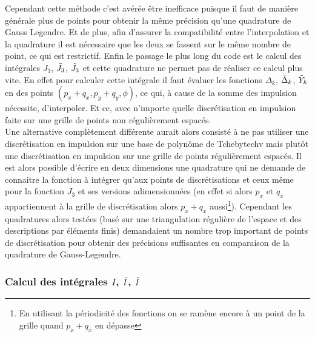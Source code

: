 \documentclass[10pt]{article}
\begin{document}
\begin{multicols}{2}
Cependant cette méthode c'est avérée être inefficace puisque il faut de manière générale plus de points pour obtenir la même précision qu'une quadrature de Gauss Legendre. Et de plus, afin d'assurer la compatibilité entre l'interpolation et la quadrature il est nécessaire que les deux se fassent sur le même nombre de point, ce qui est restrictif. Enfin le passage le plus long du code est le calcul des intégrales $J_3$, $\bar{J}_3$, $\tilde{J}_3$ et cette quadrature ne permet pas de réaliser ce calcul plus vite. En effet pour calculer cette intégrale il faut évaluer les fonctions $\Delta_k$, $\bar{\Delta}_k$, $\tilde{Y}_k$ en des points $(p_x+q_x, p_y+q_y,\phi)$, ce qui, à cause de la somme des impulsion nécessite, d'interpoler. Et ce, avec n'importe quelle discrétisation en impulsion faite sur une grille de points non régulièrement espacés. \\

Une alternative complètement différente aurait alors consisté à ne pas utiliser une discrétisation en impulsion sur une base de polynôme de Tchebytechv mais plutôt une discrétisation en impulsion sur une grille de points régulièrement espacés. Il est alors possible d'écrire en deux dimensions une quadrature qui ne demande de connaitre la fonction à intégrer qu'aux points de discrétisations et ceux même pour la fonction $J_3$ et ses versions adimensionnées (en effet si alors $p_x$ et $q_x$ appartiennent à la grille de discrétisation alors $p_x+q_x$ aussi\footnote{En utilisant la périodicité des fonctions on se ramène encore à un point de la grille quand $p_x+q_x$ en dépasse}). Cependant les quadratures alors testées (basé sur une triangulation régulière de l'espace et des descriptions par éléments finis) demandaient un nombre trop important de points de discrétisation pour obtenir des précisions suffisantes en comparaison de la quadrature de Gauss-Legendre.






\subsubsection{Calcul des intégrales $I$, $\bar{I}$, $\tilde{I}$}


\end{multicols}
\end{document}
